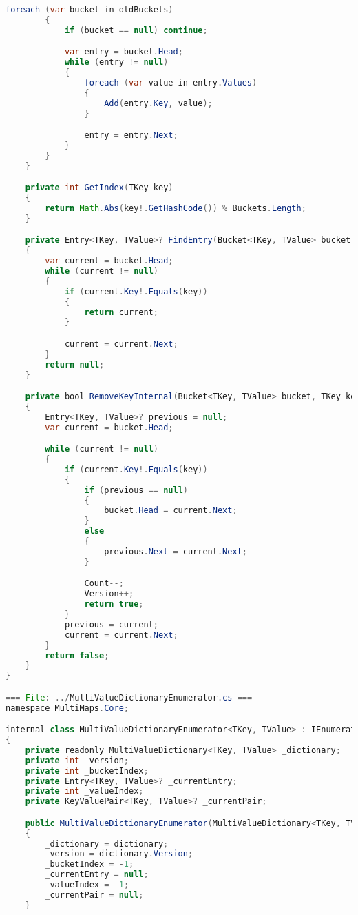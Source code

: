 \documentclass[12pt]{article}
\begin{document}
\begin{lstlisting}[language=Java]
        foreach (var bucket in oldBuckets)
        {
            if (bucket == null) continue;

            var entry = bucket.Head;
            while (entry != null)
            {
                foreach (var value in entry.Values)
                {
                    Add(entry.Key, value);
                }

                entry = entry.Next;
            }
        }
    }

    private int GetIndex(TKey key)
    {
        return Math.Abs(key!.GetHashCode()) % Buckets.Length;
    }

    private Entry<TKey, TValue>? FindEntry(Bucket<TKey, TValue> bucket, TKey key)
    {
        var current = bucket.Head;
        while (current != null)
        {
            if (current.Key!.Equals(key))
            {
                return current;
            }

            current = current.Next;
        }
        return null;
    }

    private bool RemoveKeyInternal(Bucket<TKey, TValue> bucket, TKey key)
    {
        Entry<TKey, TValue>? previous = null;
        var current = bucket.Head;

        while (current != null)
        {
            if (current.Key!.Equals(key))
            {
                if (previous == null)
                {
                    bucket.Head = current.Next;
                }
                else
                {
                    previous.Next = current.Next;
                }

                Count--;
                Version++;
                return true;
            }
            previous = current;
            current = current.Next;
        }
        return false;
    }
}

=== File: ../MultiValueDictionaryEnumerator.cs ===
namespace MultiMaps.Core;

internal class MultiValueDictionaryEnumerator<TKey, TValue> : IEnumerator<KeyValuePair<TKey, TValue>>
{
    private readonly MultiValueDictionary<TKey, TValue> _dictionary;
    private int _version;
    private int _bucketIndex;
    private Entry<TKey, TValue>? _currentEntry;
    private int _valueIndex;
    private KeyValuePair<TKey, TValue>? _currentPair;

    public MultiValueDictionaryEnumerator(MultiValueDictionary<TKey, TValue> dictionary)
    {
        _dictionary = dictionary;
        _version = dictionary.Version;
        _bucketIndex = -1;
        _currentEntry = null;
        _valueIndex = -1;
        _currentPair = null;
    }


\end{lstlisting}
\end{document}
